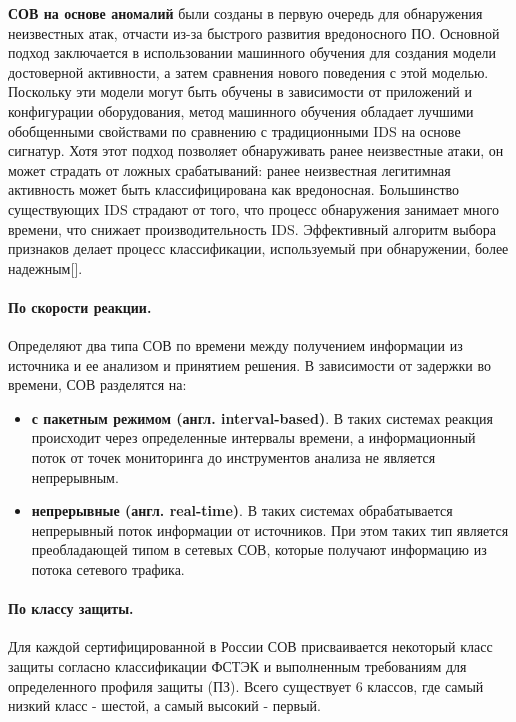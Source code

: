 \textbf{СОВ на основе аномалий} были созданы в первую очередь для обнаружения неизвестных атак, отчасти из-за быстрого развития вредоносного ПО. Основной подход заключается в использовании машинного обучения для создания модели достоверной активности, а затем сравнения нового поведения с этой моделью. Поскольку эти модели могут быть обучены в зависимости от приложений и конфигурации оборудования, метод машинного обучения обладает лучшими обобщенными свойствами по сравнению с традиционными IDS на основе сигнатур. Хотя этот подход позволяет обнаруживать ранее неизвестные атаки, он может страдать от ложных срабатываний: ранее неизвестная легитимная активность может быть классифицирована как вредоносная. Большинство существующих IDS страдают от того, что процесс обнаружения занимает много времени, что снижает производительность IDS. Эффективный алгоритм выбора признаков делает процесс классификации, используемый при обнаружении, более надежным[\cite{Rowayda}].

\paragraph*{По скорости реакции.}

Определяют два типа СОВ по времени между получением информации из источника и ее
анализом и принятием решения. В зависимости от задержки во времени, СОВ разделятся на:
\begin{itemize}
	\item \textbf{с пакетным режимом (англ. interval-based)}. В таких системах реакция
	происходит через определенные интервалы времени, а информационный поток от точек
	мониторинга до инструментов анализа не является непрерывным.

	\item \textbf{непрерывные (англ. real-time)}. В таких системах обрабатывается
	непрерывный поток информации от источников. При этом таких тип является преобладающей
	типом в сетевых СОВ, которые получают информацию из потока сетевого трафика.
\end{itemize}


\paragraph*{По классу защиты.}

Для каждой сертифицированной в России СОВ присваивается некоторый класс защиты
согласно классификации ФСТЭК и выполненным требованиям для определенного профиля защиты (ПЗ).
Всего существует 6 классов, где самый низкий класс - шестой, а самый высокий - первый.

